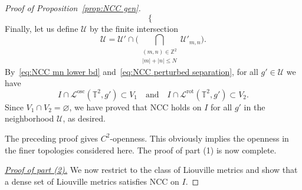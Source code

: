 \documentclass[11pt,letterpaper,oneside]{amsart}
\newcommand{\Z}{\mathbb{Z}}
\newcommand{\T}{\mathbb{T}}
\theoremstyle{definition}
\theoremstyle{remark}
\theoremstyle{definition}
\theoremstyle{remark}
\newcommand{\CL}{\mathcal{L}}
\newcommand{\CU}{\mathcal{U}}
\DeclareMathOperator{\rot}{rot}
\DeclareMathOperator{\osc}{osc}
\begin{document}
\begin{proof}[Proof of Proposition~\ref{prop:NCC gen}]
\begin{equation}
\begin{cases}
        \end{cases}
    \end{equation}
    Finally, let us define $\CU$ by the finite intersection 
    \begin{equation*}
        \CU = \CU' \cap \bigg( \bigcap_{\substack{(m,n) \in \Z^2\\ |m| + |n| \leq N}} \CU'_{m,n}\bigg).
    \end{equation*}
    By~\eqref{eq:NCC mn lower bd} and~\eqref{eq:NCC perturbed separation}, for all $g' \in \CU$ we have
    \begin{equation}
        I \cap \CL^{\osc}(\T^2, g') \subset V_1 \quad \text{and} \quad I \cap \CL^{\rot}(\T^2, g') \subset V_2.    
    \end{equation}
    Since $V_1 \cap V_2 = \varnothing$, we have proved that NCC holds on $I$ for all $g'$ in the neighborhood $\CU$, as desired.

\medskip

    The preceding proof gives $C^2$-openness. This obviously implies the openness in the finer topologies considered here. 
    The proof of part (1) is now complete.

    \medskip

	\noindent \underline{\textit{Proof of part (2).}}
    We now restrict to the class of Liouville metrics and show that a dense set of Liouville metrics satisfies NCC on $I$.

\medskip


\end{proof}
\end{document}
